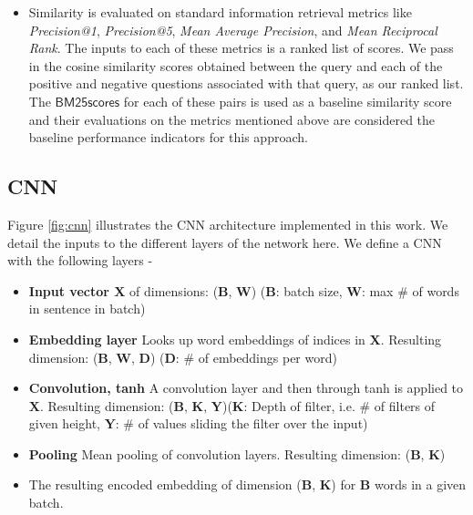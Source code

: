 \documentclass{sigkddExp}
\begin{document}
\begin{itemize}[topsep=0pt,itemsep=-1ex,partopsep=1ex,parsep=1ex]
  \item Similarity is evaluated on standard information retrieval metrics like \textit{Precision@1}, \textit{Precision@5}, \textit{Mean Average Precision}, and \textit{Mean Reciprocal Rank}. The inputs to each of these metrics is a ranked list of scores. We pass in the cosine similarity scores obtained between the query and each of the positive and negative questions associated with that query, as our ranked list. The $\mathsf{BM25 scores}$ for each of these pairs is used as a baseline similarity score and their evaluations on the metrics mentioned above are considered the baseline performance indicators for this approach.
\end{itemize}

\subsection{CNN}
Figure \ref{fig:cnn} illustrates the CNN architecture implemented in this work. We detail the inputs to the different layers of the network here.
We define a CNN with the following layers -
\begin{itemize}[topsep=0pt,itemsep=-1ex,partopsep=1ex,parsep=1ex]
\item \textbf{Input vector $\mathbf{X}$} of dimensions: ($\mathbf{B}$, $\mathbf{W}$) ($\mathbf{B}$: batch size, $\mathbf{W}$: max \# of words in sentence in batch)
\item \textbf{Embedding layer} Looks up word embeddings of indices in $\mathbf{X}$. Resulting dimension: ($\mathbf{B}$, $\mathbf{W}$, $\mathbf{D}$) ($\mathbf{D}$: \# of embeddings per word)
\item \textbf{Convolution, tanh} A convolution layer and then through tanh is applied to $\mathbf{X}$. Resulting dimension: ($\mathbf{B}$, $\mathbf{K}$, $\mathbf{Y}$)($\mathbf{K}$: Depth of filter, i.e. \# of filters of given height, $\mathbf{Y}$: \# of values sliding the filter over the input)
\item \textbf{Pooling} Mean pooling of convolution layers. Resulting dimension: ($\mathbf{B}$, $\mathbf{K}$)
\item The resulting encoded embedding of dimension ($\mathbf{B}$, $\mathbf{K}$) for $\mathbf{B}$ words in a given batch.
\end{itemize}
\end{document}
